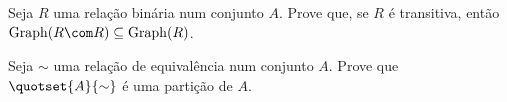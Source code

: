 \begin{exercise}
    Seja $R$ uma relação binária num conjunto $A$. Prove que, se $R$ é transitiva, então $\mathrm{Graph}(R \com R) \subseteq \mathrm{Graph}(R)$.
\end{exercise}

\begin{exercise}
    Seja $\sim$ uma relação  de equivalência num conjunto $A$. Prove que $\quotset{A}{\sim}$ é uma partição de $A$.
\end{exercise}